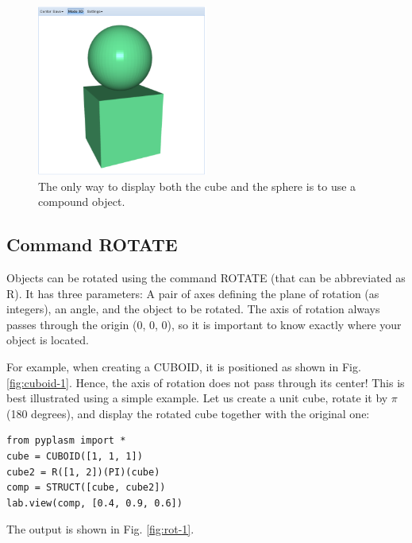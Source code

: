 \documentclass[article,A4,12pt]{llncs}
\begin{document}
\begin{figure}[!ht]
\begin{center}
\includegraphics[width=0.5\textwidth]{img/comp-1.png}
\end{center}
\vspace{-2mm}
\caption{The only way to display both the cube and the sphere is to use a compound object.}
\label{fig:comp-1}
\end{figure}

\subsection{Command ROTATE}

Objects can be rotated using the command ROTATE (that
can be abbreviated as R). It has three parameters:
A pair of axes defining the plane of rotation (as integers),
an angle, and the object to be rotated. The axis of rotation 
always passes through the origin (0, 0, 0), so it is important 
to know exactly where your object is located. 

For example, when creating 
a CUBOID, it is positioned as shown in Fig. \ref{fig:cuboid-1}.
Hence, the axis of rotation does not pass through its center!
This is best illustrated using a simple example. Let us create 
a unit cube, rotate it by $\pi$ (180 degrees), and display 
the rotated cube together with the original one:

\begin{verbatim}
from pyplasm import *
cube = CUBOID([1, 1, 1])
cube2 = R([1, 2])(PI)(cube)
comp = STRUCT([cube, cube2])
lab.view(comp, [0.4, 0.9, 0.6])
\end{verbatim}
The output is shown in Fig. \ref{fig:rot-1}.

\newpage
\end{document}
